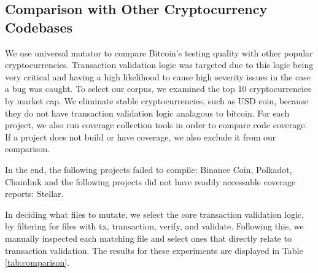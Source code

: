 \subsection{Comparison with Other Cryptocurrency Codebases}

We use universal mutator to compare Bitcoin's testing quality with other popular cryptocurrencies. Transaction validation logic was targeted
due to this logic being very critical and having a high likelihood to cause high severity issues in the case a bug was caught. To select
our corpus, we examined the top 10 cryptocurrencies by market cap. We eliminate stable cryptocurrencies, such as USD coin,
because they do not have transaction validation logic analagous to bitcoin. For each project, we also run coverage collection
tools in order to compare code coverage. If a project does not build or have coverage, we also exclude it from our comparison.

In the end, the following projects failed to compile: Binance Coin, Polkadot, Chainlink and the following projects did not have
readily accessable coverage reports: Stellar.

In deciding what files to mutate, we select the core transaction validation logic, by filtering for files
with tx, transaction, verify, and validate. Following this, we manually inspected each matching file and select
ones that directly relate to transaction validation. The results for these experiments are displayed in Table \ref{tab:comparison}.
